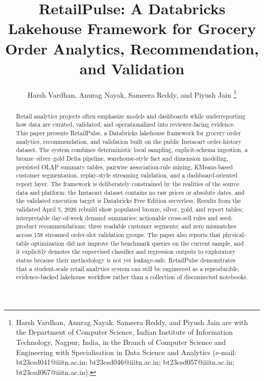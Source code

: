 \documentclass[journal]{IEEEtran}
\begin{document}
\title{RetailPulse: A Databricks Lakehouse Framework for Grocery Order Analytics, Recommendation, and Validation}

\author{Harsh Vardhan, Anurag Nayak, Sameera Reddy, and Piyush Jain%
\thanks{Harsh Vardhan, Anurag Nayak, Sameera Reddy, and Piyush Jain are with the Department of Computer Science, Indian Institute of Information Technology, Nagpur, India, in the Branch of Computer Science and Engineering with Specialisation in Data Science and Analytics (e-mail: bt23csd041@iiitn.ac.in; bt23csd046@iiitn.ac.in; bt23csd057@iiitn.ac.in; bt23csd067@iiitn.ac.in).}}

\maketitle

\begin{abstract}
Retail analytics projects often emphasize models and dashboards while underreporting how data are curated, validated, and operationalized into reviewer-facing evidence. This paper presents RetailPulse, a Databricks lakehouse framework for grocery order analytics, recommendation, and validation built on the public Instacart order-history dataset. The system combines deterministic local sampling, explicit-schema ingestion, a bronze--silver--gold Delta pipeline, warehouse-style fact and dimension modeling, persisted OLAP summary tables, pairwise association-rule mining, KMeans-based customer segmentation, replay-style streaming validation, and a dashboard-oriented report layer. The framework is deliberately constrained by the realities of the source data and platform: the Instacart dataset contains no raw prices or absolute dates, and the validated execution target is Databricks Free Edition serverless. Results from the validated April 5, 2026 rebuild show populated bronze, silver, gold, and report tables; interpretable day-of-week demand summaries; actionable cross-sell rules and seed-product recommendations; three readable customer segments; and zero mismatches across 158 streamed order-slot validation groups. The paper also reports that physical-table optimization did not improve the benchmark queries on the current sample, and it explicitly demotes the supervised classifier and regression outputs to exploratory status because their methodology is not yet leakage-safe. RetailPulse demonstrates that a student-scale retail analytics system can still be engineered as a reproducible, evidence-backed lakehouse workflow rather than a collection of disconnected notebooks.
\end{abstract}
\end{document}
